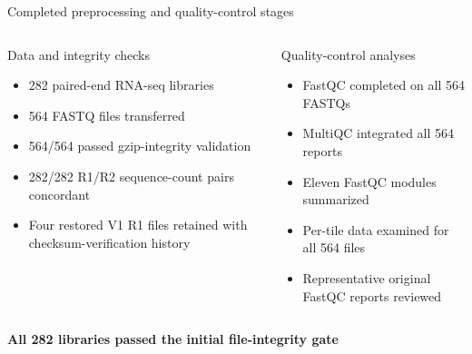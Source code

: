 \documentclass[10pt,aspectratio=169]{beamer}
\begin{document}

\begin{frame}{Completed preprocessing and quality-control stages}
	
	\vspace{0.2cm}
	
	\begin{columns}[T]
		
		
		\begin{block}{Data and integrity checks}
			
			\begin{itemize}
				\item 282 paired-end RNA-seq libraries
				\item 564 FASTQ files transferred
				\item 564/564 passed gzip-integrity validation
				\item 282/282 R1/R2 sequence-count pairs concordant
				\item Four restored V1 R1 files retained with
				checksum-verification history
			\end{itemize}
			
		\end{block}
		
		
		\begin{block}{Quality-control analyses}
			
			\begin{itemize}
				\item FastQC completed on all 564 FASTQs
				\item MultiQC integrated all 564 reports
				\item Eleven FastQC modules summarized
				\item Per-tile data examined for all 564 files
				\item Representative original FastQC reports reviewed
			\end{itemize}
			
		\end{block}
		
	\end{columns}
	
	\vspace{0.2cm}
	
	\begin{center}
		\Large
		\textcolor{mgtxteal}{
			\textbf{All 282 libraries passed the initial file-integrity gate}
		}
	\end{center}
	

\end{frame}
\end{document}
